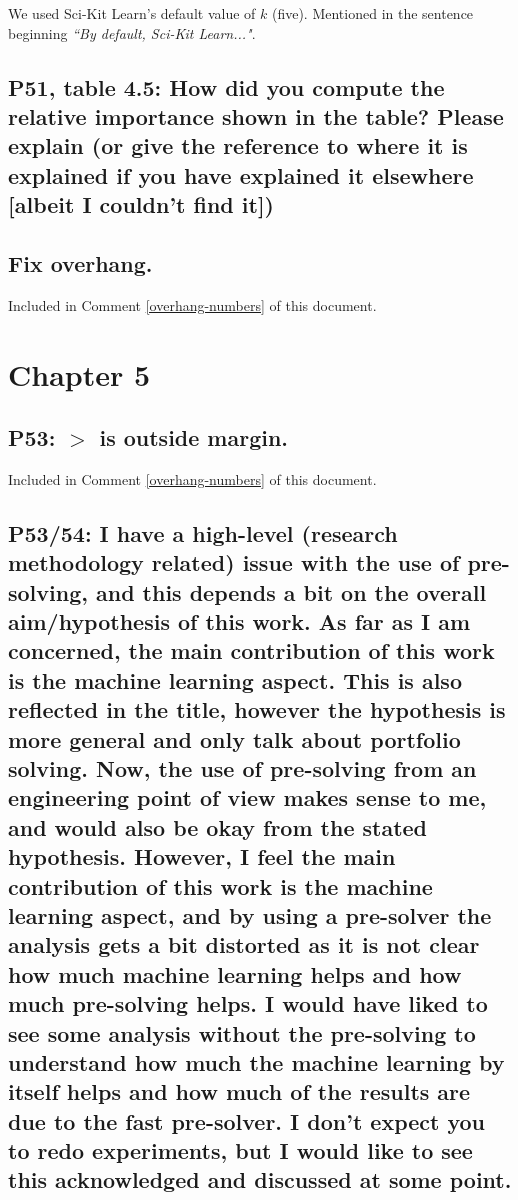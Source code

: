 \documentclass[]{article}
\begin{document}
We used Sci-Kit Learn's default value of $k$ (five). Mentioned in the sentence beginning \emph{``By default, Sci-Kit Learn..."}.

\subsection{P51, table 4.5: How did you compute the relative importance shown in the table? Please explain (or give the reference to where it is explained if you have explained it elsewhere [albeit I couldn't find it])}

\subsection{Fix overhang.}

Included in Comment \ref{overhang-numbers} of this document.

\section{Chapter 5}

\subsection{P53: $>$ is outside margin.}

Included in Comment \ref{overhang-numbers} of this document.

\subsection{P53/54: I have a high-level (research methodology related) issue with the use of pre-solving, and this depends a bit on the overall aim/hypothesis of this work. As far as I am concerned, the main contribution of this work is the machine learning aspect. This is also reflected in the title, however the hypothesis is more general and only talk about portfolio solving. Now, the use of pre-solving from an engineering point of view makes sense to me, and would also be okay from the stated hypothesis. However, I feel the main contribution of this work is the machine learning aspect, and by using a pre-solver the analysis gets a bit distorted as it is not clear how much machine learning helps and how much pre-solving helps. I would have liked to see some analysis without the pre-solving to understand how much the machine learning by itself helps and how much of the results are due to the fast pre-solver. I don't expect you to redo experiments, but I would like to see this acknowledged and discussed at some point.}
\end{document}
